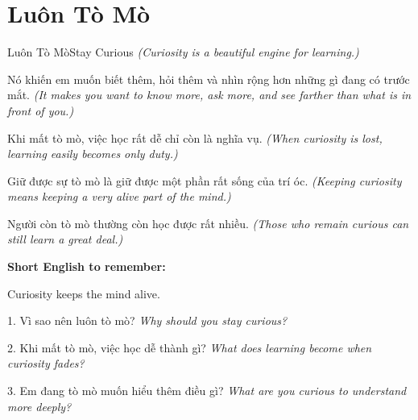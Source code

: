 \section{Luôn Tò Mò}
\begin{truyen}{Luôn Tò Mò}{Stay Curious}
\textit{(Curiosity is a beautiful engine for learning.)}

Nó khiến em muốn biết thêm, hỏi thêm và nhìn rộng hơn những gì đang có trước mắt.
\textit{(It makes you want to know more, ask more, and see farther than what is in front of you.)}

Khi mất tò mò, việc học rất dễ chỉ còn là nghĩa vụ.
\textit{(When curiosity is lost, learning easily becomes only duty.)}

Giữ được sự tò mò là giữ được một phần rất sống của trí óc.
\textit{(Keeping curiosity means keeping a very alive part of the mind.)}
\end{truyen}

\begin{baihoc}
Người còn tò mò thường còn học được rất nhiều.
\textit{(Those who remain curious can still learn a great deal.)}
\end{baihoc}

\begin{ghinhoanh}
\textbf{Short English to remember:}

Curiosity keeps the mind alive.

\end{ghinhoanh}

\begin{tuhocnhanh}
1. Vì sao nên luôn tò mò? \textit{Why should you stay curious?}

2. Khi mất tò mò, việc học dễ thành gì? \textit{What does learning become when curiosity fades?}

3. Em đang tò mò muốn hiểu thêm điều gì? \textit{What are you curious to understand more deeply?}
\end{tuhocnhanh}
\ngancach